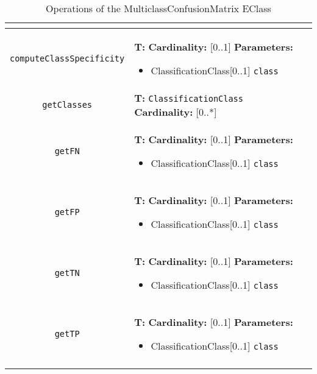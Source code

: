 \documentclass{article}
\begin{document}
\begin{table}[H]
\begin{tabularx}{\textwidth}{|c| p{4 cm} | X |}
\begin{itemize}
\end{itemize}
 & \\ \hline
\texttt{computeClassSpecificity}
 & 
\textbf{T:} \texttt{}
\newline
\textbf{Cardinality:} [0..1]
\newline
\textbf{Parameters:}
\begin{itemize}
\item ClassificationClass[0..1] \texttt{class}
\end{itemize}
 & \\ \hline
\texttt{getClasses}
 & 
\textbf{T:} \texttt{ClassificationClass}
\newline
\textbf{Cardinality:} [0..*]
 & \\ \hline
\texttt{getFN}
 & 
\textbf{T:} \texttt{}
\newline
\textbf{Cardinality:} [0..1]
\newline
\textbf{Parameters:}
\begin{itemize}
\item ClassificationClass[0..1] \texttt{class}
\end{itemize}
 & \\ \hline
\texttt{getFP}
 & 
\textbf{T:} \texttt{}
\newline
\textbf{Cardinality:} [0..1]
\newline
\textbf{Parameters:}
\begin{itemize}
\item ClassificationClass[0..1] \texttt{class}
\end{itemize}
 & \\ \hline
\texttt{getTN}
 & 
\textbf{T:} \texttt{}
\newline
\textbf{Cardinality:} [0..1]
\newline
\textbf{Parameters:}
\begin{itemize}
\item ClassificationClass[0..1] \texttt{class}
\end{itemize}
 & \\ \hline
\texttt{getTP}
 & 
\textbf{T:} \texttt{}
\newline
\textbf{Cardinality:} [0..1]
\newline
\textbf{Parameters:}
\begin{itemize}
\item ClassificationClass[0..1] \texttt{class}
\end{itemize}
 & \\ \hline
\caption{Operations of the MulticlassConfusionMatrix EClass}
\end{tabularx}
\label{e4smMulticlassConfusionMatrixop}
\end{table}
\end{document}
